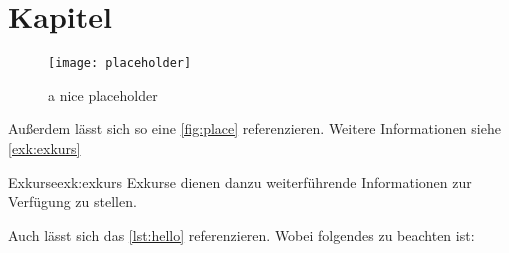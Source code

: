 \chapter{Kapitel}\label{sec:kaptiel}

\blindtext

\begin{figure}[h]
    \centering
    \texttt{[image: placeholder]}
    \caption{a nice placeholder}
    \label{fig:place}
\end{figure}

\blindtext
Außerdem lässt sich so eine \autoref{fig:place} referenzieren\cite{dreyfus:1980}.
Weitere Informationen siehe \autoref{exk:exkurs}

\begin{myExkurs}[H]{Exkurse}{exk:exkurs}
    Exkurse dienen danzu weiterführende Informationen zur Verfügung zu stellen.
\end{myExkurs}

\begin{minipage}[c]{\textwidth}
    
\end{minipage}

Auch lässt sich das \autoref{lst:hello} referenzieren.
Wobei folgendes zu beachten ist:
\blindtext

